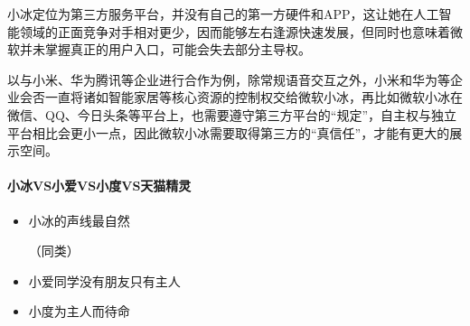 \documentclass[letterpaper,10pt,english]{sphinxmanual}
\begin{document}
小冰定位为第三方服务平台，并没有自己的第一方硬件和APP，这让她在人工智能领域的正面竞争对手相对更少，因而能够左右逢源快速发展，但同时也意味着微软并未掌握真正的用户入口，可能会失去部分主导权。

以与小米、华为腾讯等企业进行合作为例，除常规语音交互之外，小米和华为等企业会否一直将诸如智能家居等核心资源的控制权交给微软小冰，再比如微软小冰在微信、QQ、今日头条等平台上，也需要遵守第三方平台的“规定”，自主权与独立平台相比会更小一点，因此微软小冰需要取得第三方的“真信任”，才能有更大的展示空间。%
\begin{footnote}[1071]\sphinxAtStartFootnote
{}
%
\end{footnote}


\paragraph{小冰VS小爱VS小度VS天猫精灵}
\label{\detokenize{chapter_AI_company/xiaoice:vsvsvs}}\begin{itemize}
\item {} 
小冰的声线最自然%
\begin{footnote}[1072]\sphinxAtStartFootnote
{}
%
\end{footnote}（同类）

\item {} 
小爱同学没有朋友只有主人

\item {} 
小度为主人而待命

\end{itemize}
\end{document}
